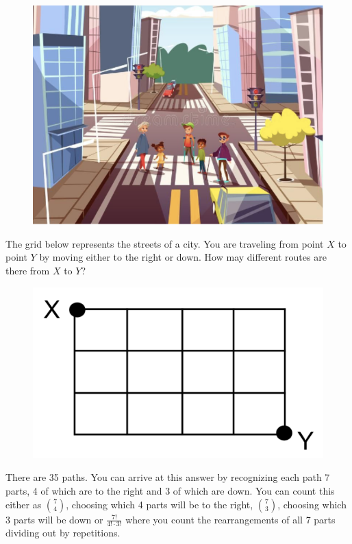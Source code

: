 \documentclass{amsbook}
\begin{document}
\vspace{.5cm}
\begin{figure}[H]
    \centering
    \includegraphics[scale=.5]{a.png}  
\end{figure}

\begin{Exercise}[title={Paths on a Grid},difficulty=1, label=c1]
The grid below represents the streets of a city. You are traveling from point $X$ to point $Y$ by moving either to the right or down. How may different routes are there from $X$ to $Y$? 
\begin{figure}[H]
    \includegraphics[scale=.5]{b.png}
\end{figure}
\end{Exercise}

\begin{Answer}[ref={c1}]
    There are 35 paths. You can arrive at this answer by recognizing each path 7 parts, 4 of which are to the right and 3 of which are down. You can count this either as $7 \choose 4$, choosing which 4 parts will be to the right, $7 \choose 3$, choosing which 3 parts will be down or $\frac{7!}{4!\cdot 3!}$ where you count the rearrangements of all 7 parts dividing out by repetitions.
\end{Answer}
\end{document}
